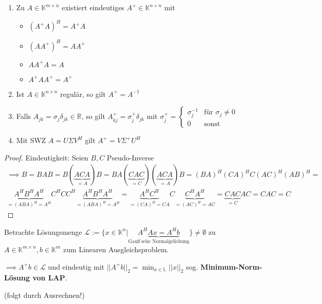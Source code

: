 \begin{corollary}
	\begin{enumerate}
		\item Zu $A \in \mathbb{K}^{m\times n}$ existiert eindeutiges $A^+ \in \mathbb{K}^{n\times n}$ mit
		\begin{itemize}
			\item $(A^+A)^H = A^+A$
			\item $(AA^+)^H = AA^+$
			\item $AA^+A=A$
			\item $A^+AA^+ = A^+$
		\end{itemize}
		\item Ist $A \in \mathbb{K}^{n\times n}$ regulär, so gilt $A^+ = A^{-1}$
		\item Falls $A_{jk} = \sigma_j \delta_{jk} \in \mathbb{R}$, so gilt $A_{kj}^+ = \sigma_j^+\delta_{jk}$ mit $\sigma_j^+ = \begin{cases}
			\sigma_j^{-1} & \text{für } \sigma_j \neq 0\\
			0 & \text{sonst}
		\end{cases}$
		\item Mit SWZ $A=U\Sigma V^H$ gilt $A^+ = V \Sigma^+ U^H$
	\end{enumerate}
\end{corollary}

\begin{proof}
	Eindeutigkeit: Seien $B,C$ Pseudo-Inverse
	\begin{align*}
		\implies B = BAB = B(\underbrace{ACA}_{=A})B = BA(\underbrace{CAC}_{=C})(\underbrace{ACA}_{=A})B =
		(BA)^H(CA)^HC(AC)^H(AB)^H =\\
		\underbrace{A^HB^HA^H}_{=(ABA)^H=A^H} C^H C C^H \underbrace{A^HB^HA^H}_{=(ABA)^H=A^H} =
		\underbrace{A^HC^H}_{=(CA)^H=CA} C \underbrace{C^HA^H}_{=(AC)^H=AC} =
		\underbrace{CAC}_{=C}AC = CAC = C
	\end{align*}
\end{proof}

\begin{remark}
	Betrachte Lösungsmenge $\mathcal{L} := \{x \in \mathbb{K}^n | \underbrace{A^HAx=A^Hb}_{\text{Gauß'sche Normalgelichung}}\} \neq \emptyset$ zu $A \in \mathbb{K}^{m\times n}, b \in \mathbb{K}^m$ zum Linearen Ausgleichsproblem.
	
	$\implies A^+b \in \mathcal{L}$ und eindeutig mit $||A^+b||_2 = \min_{x\in \mathbb{L}} ||x||_2$ sog. \textbf{Minimum-Norm-Lösung von LAP}.
	
	(folgt durch Ausrechnen!)
\end{remark}

